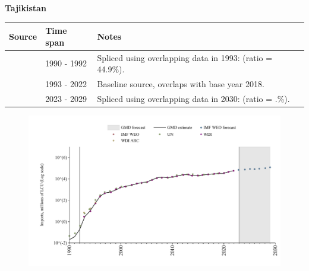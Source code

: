 \documentclass[12pt,a4paper,landscape]{article}
\begin{document}
\begin{adjustbox}{max totalsize={\paperwidth}{\paperheight},center}
\begin{minipage}[t][\textheight][t]{\textwidth}
\vspace*{0.5cm}
{}
\begin{center}
{\Large\bfseries Tajikistan}
\end{center}
\vspace{0.5cm}
\begin{table}[H]
\centering
\small
\begin{tabular}{|l|l|l|}
\hline
\textbf{Source} & \textbf{Time span} & \textbf{Notes} \\
\hline
\rowcolor{white}\cite{UN}& 1990 - 1992 &Spliced using overlapping data in 1993: (ratio = 44.9\%).\\
\rowcolor{lightgray}\cite{WDI}& 1993 - 2022 &Baseline source, overlaps with base year 2018.\\
\rowcolor{white}\cite{IMF_WEO_forecast}& 2023 - 2029 &Spliced using overlapping data in 2030: (ratio = .\%).\\
\hline
\end{tabular}
\end{table}
\begin{figure}[H]
\centering
\includegraphics[width=\textwidth,height=0.6\textheight,keepaspectratio]{graphs/TJK_imports.pdf}
\end{figure}
\end{minipage}
\end{adjustbox}
\end{document}
